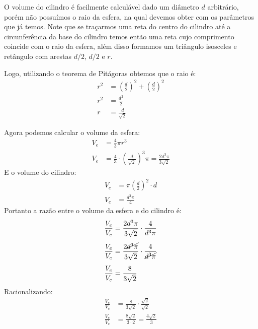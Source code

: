 \begin{multicols*}{2}
    O volume do cilindro é facilmente calculável dado um diâmetro $d$ arbitrário, 
    porém não possuímos o raio da esfera, na qual devemos obter com os parâmetros 
    que já temos. Note que se traçarmos uma reta do centro do cilindro até a circunferência da base do 
    cilindro temos então uma reta cujo comprimento coincide com o raio da esfera, 
    além disso formamos um triângulo isosceles e retângulo com arestas $d/2$, $d/2$ e $r$.
    

    \begin{figure}[H]
        \centering
    \end{figure}

    Logo, utilizando o teorema de Pitágoras obtemos que o raio é:
    \begin{align}
        r^2 &= \left(\frac{d}{2}\right)^2+\left(\frac{d}{2}\right)^2\\[1ex]
        r^2 &= \frac{d^2}{2}\\[1ex]
        r &= \frac{d}{\sqrt{2}}
    \end{align} 

    Agora podemos calcular o volume da esfera:
    \begin{align}
        V_e &= \frac{4}{3}\pi r^3 \\[1ex]
        V_e &= \frac{4}{3}\cdot\left(\frac{d}{\sqrt{2}}\right)^3\pi
        = \frac{2d^3\pi}{3\sqrt{2}}
    \end{align}
    E o volume do cilindro:
    \begin{align}
        V_c &= \pi \left( \frac{d}{2} \right)^2 \cdot d\\[1ex]
        V_c &= \frac{d^3\pi}{4}
    \end{align}
    Portanto a razão entre o volume da esfera e do cilindro é:
    \begin{align}
        \frac{V_e}{V_c} &= \frac{2d^3\pi}{3\sqrt{2}}\cdot \frac{4}{d^3\pi}\\[1ex]
        \frac{V_e}{V_c} &= \frac{2\cancel{d^3\pi}}{3\sqrt{2}}\cdot \frac{4}{\cancel{d^3\pi}}\\[1ex]
        \frac{V_e}{V_c} &= \frac{8}{3\sqrt{2}}
    \end{align}
    Racionalizando:
    \begin{align}
        \frac{V_e}{V_c} &= \frac{8}{3\sqrt{2}} \cdot\frac{\sqrt{2}}{\sqrt{2}}\\
        \frac{V_e}{V_c} &= \frac{8\sqrt{2}}{3\cdot2} = \frac{4\sqrt{2}}{3}
    \end{align}
    

\end{multicols*}
